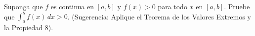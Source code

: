 Suponga que $f$ es continua en $[a, b]$ y $f(x) > 0$ para todo $x$ en $[a, b]$. Pruebe que $\int_a^b f(x) \, dx > 0$. (Sugerencia: Aplique el Teorema de los Valores Extremos y la Propiedad 8).
